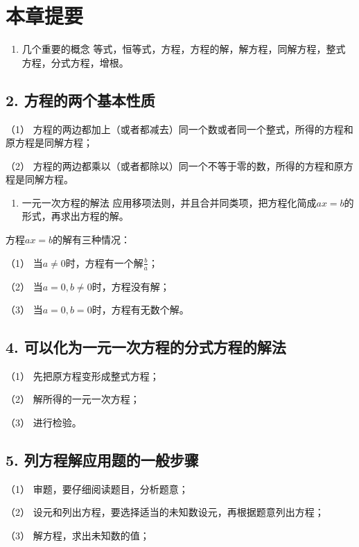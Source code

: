 \section{本章提要}

\begin{enumerate}
\item
  几个重要的概念
  等式，恒等式，方程，方程的解，解方程，同解方程，整式方程，分式方程，增根。
\end{enumerate}

\subsection{2. 方程的两个基本性质}

（1）
方程的两边都加上（或者都减去）同一个数或者同一个整式，所得的方程和原方程是同解方程；

（2）
方程的两边都乘以（或者都除以）同一个不等于零的数，所得的方程和原方程是同解方程。

\begin{enumerate}[start=3]
\item
  一元一次方程的解法
  应用移项法则，并且合并同类项，把方程化简成\(ax = b\)的形式，再求出方程的解。
\end{enumerate}

方程\(ax = b\)的解有三种情况：

（1） 当\(a \neq 0\)时，方程有一个解\(\frac{b}{a}\)；

（2） 当\(a = 0, b \neq 0\)时，方程没有解；

（3） 当\(a = 0, b = 0\)时，方程有无数个解。

\subsection{4. 可以化为一元一次方程的分式方程的解法}

（1） 先把原方程变形成整式方程；

（2） 解所得的一元一次方程；

（3） 进行检验。

\subsection{5. 列方程解应用题的一般步骤}

（1） 审题，要仔细阅读题目，分析题意；

（2） 设元和列出方程，要选择适当的未知数设元，再根据题意列出方程；

（3） 解方程，求出未知数的值；

